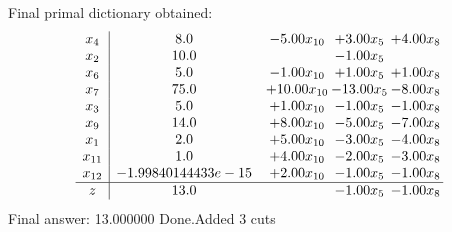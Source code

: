 \documentclass[8pt]{article}
\begin{document}
 Final primal dictionary obtained: 
\[\begin{array}{c| c c@{\hskip 2pt} c@{\hskip 2pt} c@{\hskip 2pt} }
 x_{4}   &  8.0 & -5.00 x_{10} & +  3.00 x_{5} & +  4.00 x_{8}\\
 x_{2}   &  10.0  &   & -1.00 x_{5} &   \\
 x_{6}   &  5.0 & -1.00 x_{10} & +  1.00 x_{5} & +  1.00 x_{8}\\
 x_{7}   &  75.0 & + 10.00 x_{10} & -13.00 x_{5} & -8.00 x_{8}\\
 x_{3}   &  5.0 & +  1.00 x_{10} & -1.00 x_{5} & -1.00 x_{8}\\
 x_{9}   &  14.0 & +  8.00 x_{10} & -5.00 x_{5} & -7.00 x_{8}\\
 x_{1}   &  2.0 & +  5.00 x_{10} & -3.00 x_{5} & -4.00 x_{8}\\
 x_{11}   &  1.0 & +  4.00 x_{10} & -2.00 x_{5} & -3.00 x_{8}\\
 x_{12}   &  -1.99840144433e-15 & +  2.00 x_{10} & -1.00 x_{5} & -1.00 x_{8}\\
\hline
z    &  13.0  &   & -1.00 x_{5} & -1.00 x_{8}\\
\end{array}\]
 Final answer: 13.000000 
Done.Added 3 cuts 
\end{document}
